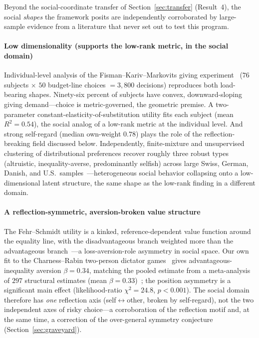\documentclass[journal]{IEEEtran}
\begin{document}
Beyond the social-coordinate transfer of Section~\ref{sec:transfer} (Result~4), the social \emph{shapes} the framework posits are independently corroborated by large-sample evidence from a literature that never set out to test this program.

\paragraph{Low dimensionality (supports the low-rank metric, in the social domain)}
Individual-level analysis of the Fisman--Kariv--Markovits giving experiment~\cite{fisman2007} ($76$ subjects $\times$ $50$ budget-line choices $=3{,}800$ decisions) reproduces both load-bearing shapes.
Ninety-six percent of subjects have convex, downward-sloping giving demand---choice is metric-governed, the geometric premise.
A two-parameter constant-elasticity-of-substitution utility fits each subject (mean $R^2=0.54$), the social analog of a low-rank metric at the individual level.
And strong self-regard (median own-weight $0.78$) plays the role of the reflection-breaking field discussed below.
Independently, finite-mixture and unsupervised clustering of distributional preferences recover roughly three robust types (altruistic, inequality-averse, predominantly selfish) across large Swiss, German, Danish, and U.S.\ samples~\cite{bruhin2019,fehrCharness2025}---heterogeneous social behavior collapsing onto a low-dimensional latent structure, the same shape as the low-rank finding in a different domain.

\paragraph{A reflection-symmetric, aversion-broken value structure}
The Fehr--Schmidt utility is a kinked, reference-dependent value function around the equality line, with the disadvantageous branch weighted more than the advantageous branch~\cite{fehr1999}---a loss-aversion-role asymmetry in social space.
Our own fit to the Charness--Rabin two-person dictator games~\cite{charness2002} gives advantageous-inequality aversion $\beta=0.34$, matching the pooled estimate from a meta-analysis of $297$ structural estimates (mean $\beta=0.33$)~\cite{nunnariPozzi2022}; the position asymmetry is a significant main effect (likelihood-ratio $\chi^2=24.8$, $p<0.001$).
The social domain therefore has \emph{one} reflection axis (self$\leftrightarrow$other, broken by self-regard), not the two independent axes of risky choice---a corroboration of the reflection motif and, at the same time, a correction of the over-general symmetry conjecture (Section~\ref{sec:graveyard}).
\end{document}
